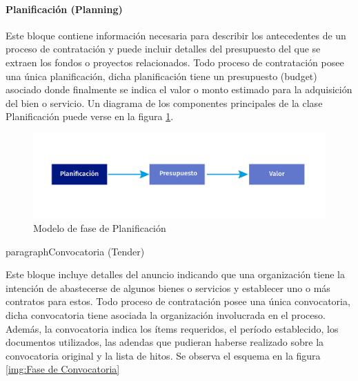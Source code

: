 \paragraph{Planificación (Planning)}

Este bloque contiene información necesaria para describir los antecedentes de un proceso de contratación y puede incluir detalles del presupuesto del que se extraen los fondos o proyectos relacionados. Todo proceso de contratación posee una única planificación, dicha planificación tiene un presupuesto (budget) asociado donde finalmente se indica el valor o monto estimado para la adquisición del bien o servicio. Un diagrama de los componentes principales de la clase Planificación puede verse en la figura \ref{img:Fase de Planificacion}.

\begin{figure}[h!]
    \centering
    \includegraphics[width=150mm]{figuras/Diagramas_Planificacion.png}
    \caption{Modelo de fase de Planificación}
    \label{img:Fase de Planificacion}
\end{figure}

paragraph{Convocatoria (Tender)}

Este bloque incluye detalles del anuncio indicando que una organización tiene la intención de abastecerse de algunos bienes o servicios y establecer uno o más contratos para estos. Todo proceso de contratación posee una única convocatoria, dicha convocatoria tiene asociada la organización involucrada en el proceso. Además, la convocatoria indica los ítems requeridos, el período establecido, los documentos utilizados, las adendas que pudieran haberse realizado sobre la convocatoria original y la lista de hitos. Se observa el esquema en la figura \ref{img:Fase de Convocatoria}

